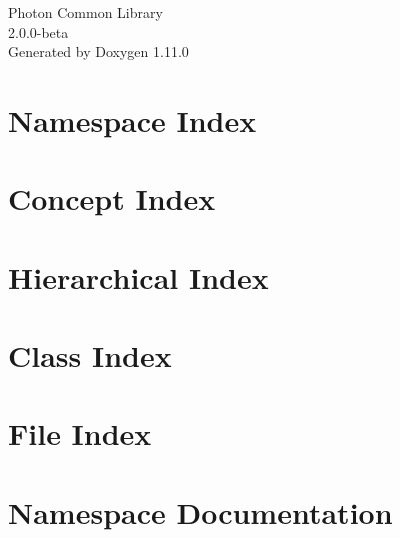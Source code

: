 \documentclass[twoside]{book}
\newcommand{\+}{\discretionary{\mbox{\scriptsize$\hookleftarrow$}}{}{}}
\newcommand{\clearemptydoublepage}{%
    \newpage{\pagestyle{empty}\cleardoublepage}%
  }
\begin{document}
  \raggedbottom
    \hypersetup{pageanchor=false,
                bookmarksnumbered=true,
                pdfencoding=unicode
               }
  \begin{titlepage}
  \vspace*{7cm}
  \begin{center}%
  {\Large Photon Common Library}\\
  [1ex]\large 2.\+0.\+0-\/beta \\
  \vspace*{1cm}
  {\large Generated by Doxygen 1.11.0}\\
  \end{center}
  \end{titlepage}
  \clearemptydoublepage
  \tableofcontents
  \clearemptydoublepage
  \hypersetup{pageanchor=true}

\chapter{Namespace Index}

\chapter{Concept Index}

\chapter{Hierarchical Index}

\chapter{Class Index}

\chapter{File Index}

\chapter{Namespace Documentation}









\end{document}

